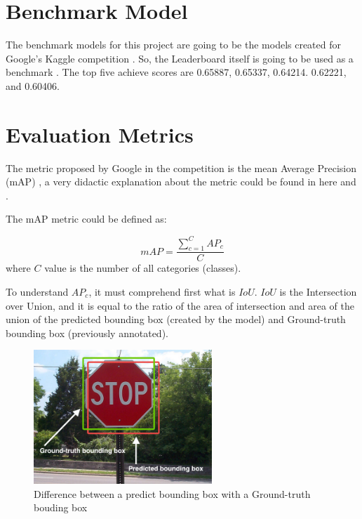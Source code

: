 \documentclass[11pt]{article}
\begin{document}
\section{Benchmark Model}

The benchmark models for this project are going to be the models created for Google's Kaggle competition \cite{kaggle}. So, the Leaderboard itself is going to be used as a benchmark \cite{leaderboard}. The top five achieve scores are 0.65887, 0.65337, 0.64214. 0.62221, and 0.60406.

\section{Evaluation Metrics}

The metric proposed by Google in the competition is the mean Average Precision (mAP) \cite{map}, a very didactic explanation about the metric could be found in here \cite{medium:1} and \cite{medium:2}.

The mAP metric could be defined as:

{\centering
	\begin{equation*}
	mAP = \frac{\sum\limits_{c=1}^{C}AP_c} {C}
	\end{equation*}}
where $C$ value is the number of all categories (classes).

To understand $AP_c$, it must comprehend first what is $IoU$. $IoU$ is the Intersection over Union, and it is equal to the ratio of the area of intersection and area of the union of the predicted bounding box (created by the model) and Ground-truth bounding box (previously annotated).

\begin{figure}[ht]
	
	\centering
	\includegraphics[width=0.6\textwidth]{iou_stop_sign.jpg}
	\caption{\scriptsize  Difference between a predict bounding box with a Ground-truth bouding box \cite{pyimage}}
	
\end{figure}
\end{document}
